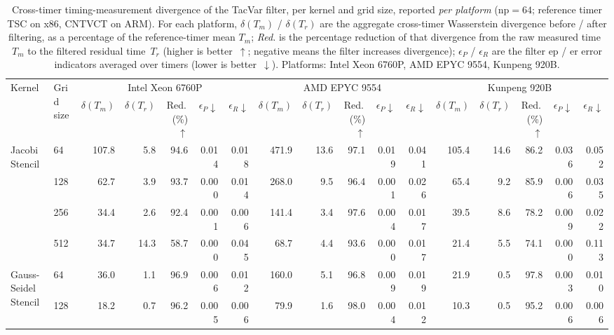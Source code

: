 \begin{table}[htbp]
\centering
\scriptsize
\caption{Cross-timer timing-measurement divergence of the TacVar filter, per kernel and grid size, reported \emph{per platform} ($\mathrm{np}=64$; reference timer TSC on x86, CNTVCT on ARM). For each platform, $\delta(T_m)$ / $\delta(T_r)$ are the aggregate cross-timer Wasserstein divergence before / after filtering, as a percentage of the reference-timer mean $T_m$; \emph{Red.} is the percentage reduction of that divergence from the raw measured time~$T_m$ to the filtered residual time~$T_r$ (higher is better~$\uparrow$; negative means the filter increases divergence); $\epsilon_P$ / $\epsilon_R$ are the filter ep / er error indicators averaged over timers (lower is better~$\downarrow$). Platforms: Intel Xeon 6760P, AMD EPYC 9554, Kunpeng 920B.}
\label{tab:xtimer-divergence-reduction}
\begin{tabular}{llrrrrrrrrrrrrrrr}
\toprule
\multirow{2}{*}{Kernel} & \multirow{2}{*}{Grid size} & \multicolumn{5}{c}{Intel Xeon 6760P} & \multicolumn{5}{c}{AMD EPYC 9554} & \multicolumn{5}{c}{Kunpeng 920B} \\
\cmidrule(lr){3-7}\cmidrule(lr){8-12}\cmidrule(lr){13-17}
 &  & $\delta(T_m)$ & $\delta(T_r)$ & Red.\,(\%)$\uparrow$ & $\epsilon_P\!\downarrow$ & $\epsilon_R\!\downarrow$ & $\delta(T_m)$ & $\delta(T_r)$ & Red.\,(\%)$\uparrow$ & $\epsilon_P\!\downarrow$ & $\epsilon_R\!\downarrow$ & $\delta(T_m)$ & $\delta(T_r)$ & Red.\,(\%)$\uparrow$ & $\epsilon_P\!\downarrow$ & $\epsilon_R\!\downarrow$ \\
\midrule
\multirow{4}{*}{Jacobi Stencil} & 64 & 107.8 & 5.8 & 94.6 & 0.014 & 0.018 & 471.9 & 13.6 & 97.1 & 0.019 & 0.041 & 105.4 & 14.6 & 86.2 & 0.036 & 0.052 \\
 & 128 & 62.7 & 3.9 & 93.7 & 0.000 & 0.014 & 268.0 & 9.5 & 96.4 & 0.001 & 0.026 & 65.4 & 9.2 & 85.9 & 0.006 & 0.035 \\
 & 256 & 34.4 & 2.6 & 92.4 & 0.001 & 0.006 & 141.4 & 3.4 & 97.6 & 0.004 & 0.017 & 39.5 & 8.6 & 78.2 & 0.009 & 0.022 \\
 & 512 & 34.7 & 14.3 & 58.7 & 0.000 & 0.045 & 68.7 & 4.4 & 93.6 & 0.000 & 0.017 & 21.4 & 5.5 & 74.1 & 0.000 & 0.113 \\
\midrule
\multirow{4}{*}{Gauss-Seidel Stencil} & 64 & 36.0 & 1.1 & 96.9 & 0.006 & 0.012 & 160.0 & 5.1 & 96.8 & 0.009 & 0.019 & 21.9 & 0.5 & 97.8 & 0.003 & 0.010 \\
 & 128 & 18.2 & 0.7 & 96.2 & 0.005 & 0.006 & 79.9 & 1.6 & 98.0 & 0.004 & 0.012 & 10.3 & 0.5 & 95.2 & 0.006 & 0.006 \\

\end{tabular}
\end{table}
